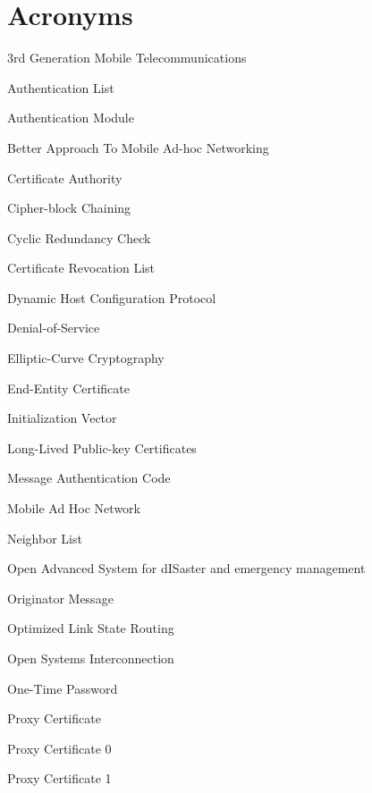 \chapter*{Acronyms}

\begin{acronym}

 {3rd Generation Mobile Telecommunications}


 {Authentication List}

 {Authentication Module}

 {Better Approach To Mobile Ad-hoc Networking}

 {Certificate Authority}

 {Cipher-block Chaining}

 {Cyclic Redundancy Check}

 {Certificate Revocation List}

 {Dynamic Host Configuration Protocol}


 {Denial-of-Service}

 {Elliptic-Curve Cryptography}

 {End-Entity Certificate}

 {Initialization Vector}

 {Long-Lived Public-key Certificates}

 {Message Authentication Code}

 {Mobile Ad Hoc Network}


 {Neighbor List}

 {Open Advanced System for dISaster and emergency management}

 {Originator Message}

 {Optimized Link State Routing}

 {Open Systems Interconnection}

 {One-Time Password}

 {Proxy Certificate}

 {Proxy Certificate 0}

 {Proxy Certificate 1}



\end{acronym}
